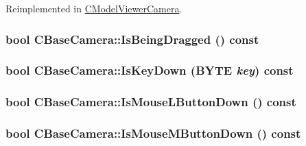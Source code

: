 Reimplemented in \hyperlink{class_c_model_viewer_camera_ad50f3bd74420f1ee3c0b6ca9ac3ec348}{CModelViewerCamera}.\hypertarget{class_c_base_camera_a3928806e81783b1b3138833585d5f5d0}{
\subsubsection[{IsBeingDragged}]{\setlength{\rightskip}{0pt plus 5cm}bool CBaseCamera::IsBeingDragged () const}}
\label{class_c_base_camera_a3928806e81783b1b3138833585d5f5d0}
\hypertarget{class_c_base_camera_ac00770963442a7527b0fafe4a9ade260}{
\subsubsection[{IsKeyDown}]{\setlength{\rightskip}{0pt plus 5cm}bool CBaseCamera::IsKeyDown (BYTE {\em key}) const}}
\label{class_c_base_camera_ac00770963442a7527b0fafe4a9ade260}
\hypertarget{class_c_base_camera_a9b7c2e2595e2c7fff4afe8a92291feaf}{
\subsubsection[{IsMouseLButtonDown}]{\setlength{\rightskip}{0pt plus 5cm}bool CBaseCamera::IsMouseLButtonDown () const}}
\label{class_c_base_camera_a9b7c2e2595e2c7fff4afe8a92291feaf}
\hypertarget{class_c_base_camera_ae258726567f469b2e2bdbca54c3b9203}{
\subsubsection[{IsMouseMButtonDown}]{\setlength{\rightskip}{0pt plus 5cm}bool CBaseCamera::IsMouseMButtonDown () const}}
\label{class_c_base_camera_ae258726567f469b2e2bdbca54c3b9203}
